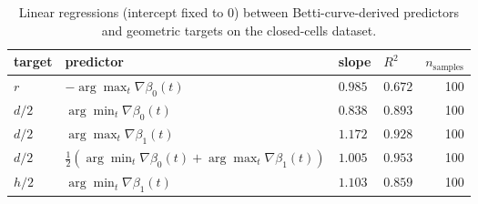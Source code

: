 \begin{table}[ht]
\centering
\caption{Linear regressions (intercept fixed to $0$) between Betti-curve-derived predictors and geometric targets on the closed-cells dataset.}
\label{tab:exp3_regressions}
\begin{tabular}{llllr}
\hline
\textbf{target} & \textbf{predictor} & \textbf{slope} & \textbf{$R^2$} & \textbf{$n_{\mathrm{samples}}$} \\
\hline
$r$ & $-\arg\max_t \nabla \beta_0(t)$ & $0.985$ & $0.672$ & 100 \\
$d/2$ & $\arg\min_t \nabla \beta_0(t)$ & $0.838$ & $0.893$ & 100 \\
$d/2$ & $\arg\max_t \nabla \beta_1(t)$ & $1.172$ & $0.928$ & 100 \\
$d/2$ & $\frac{1}{2}\!\left(\arg\min_t \nabla \beta_0(t)+\arg\max_t \nabla \beta_1(t)\right)$ & $1.005$ & $0.953$ & 100 \\
$h/2$ & $\arg\min_t \nabla \beta_1(t)$ & $1.103$ & $0.859$ & 100 \\
\hline
\end{tabular}
\end{table}
